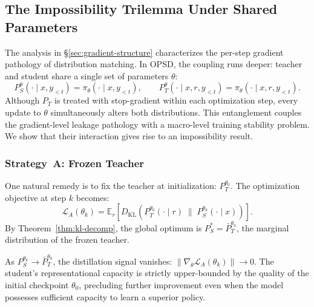 \documentclass[]{jingdong}
\begin{document}

\subsection{The Impossibility Trilemma Under Shared Parameters}
\label{app:trilemma}

The analysis in \S\ref{sec:gradient-structure} characterizes the per-step gradient pathology of distribution matching. In OPSD, the coupling runs deeper: teacher and student share a single set of parameters $\theta$:
\begin{equation}
    P_S^\theta(\cdot \mid x, y_{<t}) = \pi_\theta(\cdot \mid x, y_{<t}), \qquad P_T^\theta(\cdot \mid x, r, y_{<t}) = \pi_\theta(\cdot \mid x, r, y_{<t}).
\end{equation}
Although $P_T$ is treated with stop-gradient within each optimization step, every update to $\theta$ simultaneously alters both distributions. This entanglement couples the gradient-level leakage pathology with a macro-level training stability problem. We show that their interaction gives rise to an impossibility result.

\subsubsection{Strategy~A: Frozen Teacher}

One natural remedy is to fix the teacher at initialization: $P_T^{\theta_0}$. The optimization objective at step $k$ becomes:
\begin{equation}
    \mathcal{L}_A(\theta_k) = \mathbb{E}_r\!\left[D_{\mathrm{KL}}\!\left(P_T^{\theta_0}(\cdot \mid r) \;\|\; P_S^{\theta_k}(\cdot \mid x)\right)\right].
\end{equation}
By Theorem~\ref{thm:kl-decomp}, the global optimum is $P_S^* = \bar{P}_T^{\theta_0}$, the marginal distribution of the frozen teacher.

\begin{proposition}
\label{prop:frozen-ceiling}
As $P_S^{\theta_k} \to \bar{P}_T^{\theta_0}$, the distillation signal vanishes: $\|\nabla_\theta \mathcal{L}_A(\theta_k)\| \to 0$. The student's representational capacity is strictly upper-bounded by the quality of the initial checkpoint $\theta_0$, precluding further improvement even when the model possesses sufficient capacity to learn a superior policy.
\end{proposition}
\end{document}

